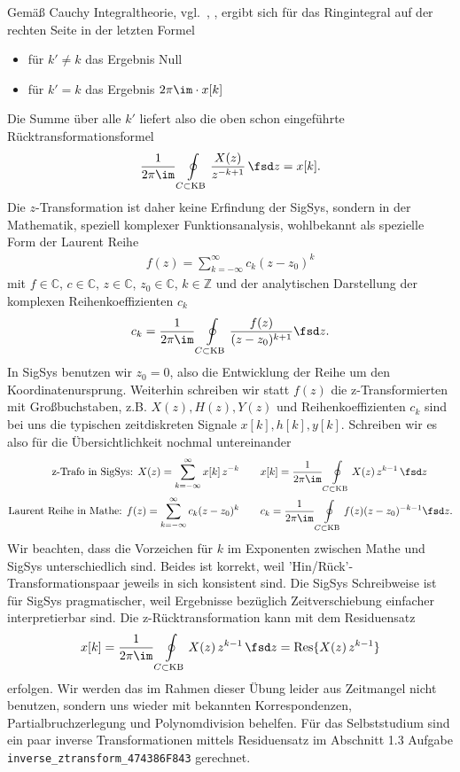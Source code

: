 Gemäß Cauchy Integraltheorie, vgl.~\cite[Kap.\,5]{Strang2007,Strang2010}, \cite[Kap.\,2]{Burg2013b},
ergibt sich für das Ringintegral auf der rechten Seite in der letzten Formel
\begin{itemize}
  \item für $k' \neq k$ das Ergebnis Null
  \item für $k' = k$ das Ergebnis $2\pi \im \cdot x[k]$
\end{itemize}
Die Summe über alle $k'$ liefert also die oben schon eingeführte Rücktransformationsformel
\begin{align}
\frac{1}{2\pi \im} \oint\limits_{C \subset \text{KB}} \frac{X(z)}{z^{-k+1}} \, \fsd z
= x[k].
\end{align}
%
Die $z$-Transformation ist daher keine Erfindung der SigSys, sondern in der
Mathematik, speziell komplexer Funktionsanalysis, wohlbekannt als spezielle
Form der Laurent Reihe~\cite[S.\,56ff]{Wunsch1972}
\begin{align}
f(z) = \sum_{k=-\infty}^{\infty} c_k (z - z_0)^k
\end{align}
mit $f\in\mathbb{C}$, $c\in\mathbb{C}$, $z\in\mathbb{C}$, $z_0\in\mathbb{C}$, $k\in\mathbb{Z}$
und der analytischen Darstellung der komplexen Reihenkoeffizienten $c_k$
\begin{align}
c_k = \frac{1}{2\pi\im}\oint\limits_{C \subset \text{KB}}
\frac{f(z)}{(z-z_0)^{k+1}}\fsd z.
\end{align}
%
In SigSys benutzen wir $z_0=0$, also die Entwicklung der Reihe um den
Koordinatenursprung.
%
Weiterhin schreiben wir statt $f(z)$ die z-Transformierten mit Großbuchstaben,
z.B. $X(z), H(z), Y(z)$ und Reihenkoeffizienten $c_k$ sind bei uns die typischen
zeitdiskreten Signale $x[k], h[k], y[k]$.
%
Schreiben wir es also für die Übersichtlichkeit nochmal untereinander
\begin{align}
\text{z-Trafo in SigSys:   } X(z) = \sum_{k=-\infty}^{\infty} x[k] \, z^{-k}\qquad
&x[k] = \frac{1}{2\pi \im} \oint\limits_{C \subset \text{KB}} X(z) \, z^{k-1} \, \fsd z\\
\text{Laurent Reihe in Mathe:   } f(z) = \sum_{k=-\infty}^{\infty} c_k (z - z_0)^k\qquad
&c_k = \frac{1}{2\pi\im}\oint\limits_{C \subset \text{KB}}
f(z) (z-z_0)^{-k-1}\fsd z.
\end{align}
Wir beachten, dass die Vorzeichen für $k$ im Exponenten zwischen Mathe und SigSys
unterschiedlich sind.
%
Beides ist korrekt, weil 'Hin/Rück'-Transformationspaar jeweils in sich
konsistent sind.
%
Die SigSys Schreibweise ist für SigSys pragmatischer, weil Ergebnisse
bezüglich Zeitverschiebung einfacher interpretierbar sind.
%
Die z-Rücktransformation kann mit dem Residuensatz
\begin{align}
x[k] = \frac{1}{2\pi \im} \oint\limits_{C \subset \text{KB}} X(z) \, z^{k-1} \, \fsd z
= \text{Res}\{X(z) \, z^{k-1}\}
\end{align}
erfolgen.
%
Wir werden das im Rahmen dieser Übung leider
aus Zeitmangel nicht benutzen, sondern uns wieder mit bekannten Korrespondenzen,
Partialbruchzerlegung und Polynomdivision behelfen.
%
Für das Selbststudium sind ein paar inverse Transformationen mittels Residuensatz
im Abschnitt 1.3 Aufgabe \texttt{inverse\_ztransform\_474386F843}
gerechnet.


